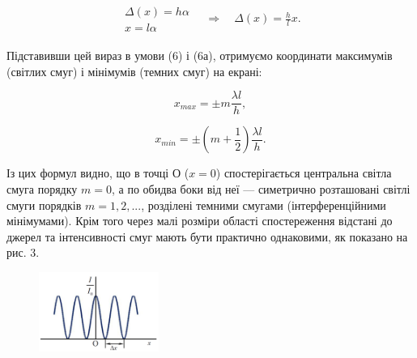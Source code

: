 \documentclass[12pt,a4paper]{article}
\begin{document}
    \begin{equation}
        \begin{aligned}
        \begin{array}{l}
        \Delta(x) = h\alpha \\
        x = l\alpha
        \end{array}
        \quad \Rightarrow \quad
        \Delta(x) = \frac{h}{l}x.
        \end{aligned}
        \tag{7}
    \end{equation}

    Підставивши цей вираз в умови (6) і (6а), отримуємо координати максимумів
    (світлих смуг) і мінімумів (темних смуг) на екрані:

    \begin{equation}
        x_{max} = \pm m \frac{\lambda l}{h},
        \tag{8}
    \end{equation}

    \begin{equation}
        x_{min} = \pm \left( m + \frac{1}{2} \right) \frac{\lambda l}{h}.
        \tag{8а}
    \end{equation}

    Із цих формул видно, що в точці О ($x = 0$) спостерігається центральна
    світла смуга порядку $m = 0$, а по обидва боки від неї --- симетрично розташовані світлі смуги порядків
    $m = 1, 2, ...$, розділені темними смугами (інтерференційними мінімумами).
    Крім того через малі розміри області спостереження відстані до джерел та інтенсивності смуг мають бути практично однаковими, як показано на рис. 3.

    \begin{figure}[!ht]

        \renewcommand{\thefigure}{\arabic{figure}} %

        \centering
        \includegraphics[width=0.35\textwidth]{3.png}
        \caption{}
        \label{fig3:schema}

    \end{figure}
\end{document}
